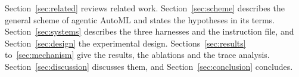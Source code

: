 Section~\ref{sec:related} reviews related work.
Section~\ref{sec:scheme} describes the general scheme of agentic AutoML and
states the hypotheses in its terms. Section~\ref{sec:systems} describes the
three harnesses and the instruction file, and Section~\ref{sec:design} the
experimental design. Sections~\ref{sec:results} to~\ref{sec:mechanism}
give the results, the ablations and the trace analysis.
Section~\ref{sec:discussion} discusses them, and
Section~\ref{sec:conclusion} concludes.
